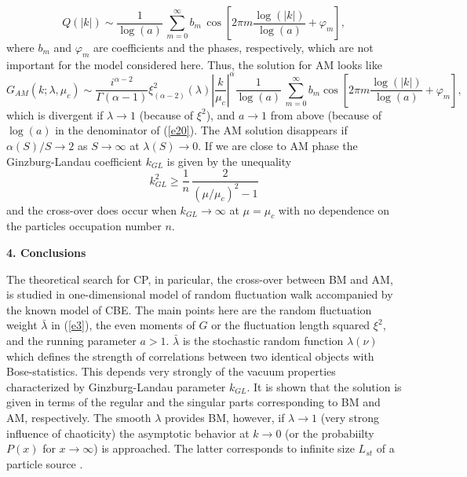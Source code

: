 \documentclass[WPCF,manyauthors]{wpcfTemplate}
\begin{document}
$$ Q(\vert k\vert) \sim \frac{1}{\log (a)}\,\sum_{m=0}^{\infty} b_{m}\,\cos\left [2\pi m \frac{\log (\vert k\vert)}{\log (a)} + \varphi_{m}\right ], $$
 where $b_{m}$ and $\varphi_{m}$ are coefficients and the phases, respectively, which are not important for the model considered here. 
Thus, the solution for AM looks like
\begin{equation}
\label{e20}
G_{AM}(k;\lambda, \mu_{c}) \sim \frac{i^{\alpha-2}}{\Gamma (\alpha -1)}\xi^{2}_{(\alpha -2)} (\lambda) {\left \vert\frac{k}{\mu_{c}}\right \vert}^{\alpha} \frac{1}{\log (a)}\,\sum_{m=0}^{\infty} b_{m}\cos\left [2\pi m \frac{\log (\vert k\vert)}{\log (a)} + \varphi_{m}\right ],
\end{equation}
which is divergent if $\lambda\rightarrow 1$ (because of $\xi^{2}$), and $a\rightarrow 1$ from above (because of $\log (a)$ in the denominator of (\ref{e20}). The AM solution disappears if $\alpha (S)/S \rightarrow 2$ as $S\rightarrow \infty$ at $\lambda (S)\rightarrow 0$.
If we are close to AM phase the Ginzburg-Landau coefficient $k_{GL}$ is given by the unequality 
$$ k^{2}_{GL} \geq \frac{1}{n}\,\frac{2}{\left (\mu/\mu_{c}\right )^{2} -1} $$
and the cross-over  does occur when $k_{GL}\rightarrow\infty$ at $\mu = \mu_{c}$ with no dependence on the particles occupation number $n$. 


{\bf 4. Conclusions }

The theoretical search for CP, in paricular, the cross-over between BM and AM, is studied in one-dimensional model of random fluctuation walk accompanied by the known model of CBE. The main points here are the random fluctuation weight $\bar\lambda$ in (\ref{e3}), the even moments of $G$ or the fluctuation length squared $\xi^{2}$, and the running parameter $a >1$. $\bar\lambda$ is the stochastic random  function $\lambda (\nu)$ which defines the strength of correlations between two identical objects with Bose-statistics. This depends very strongly of the vacuum properties characterized by Ginzburg-Landau parameter $k_{GL}$. It is shown that the solution is given in terms of the regular and the singular parts corresponding to BM and AM, respectively. The smooth $\lambda$ provides BM, however, if $\lambda\rightarrow 1$ (very strong influence of chaoticity) the asymptotic behavior at $k\rightarrow 0$ (or the  probabiilty $P(x)$ for $x\rightarrow\infty$) is approached. The latter corresponds to infinite size $L_{st}$ of a particle source . 
\end{document}
